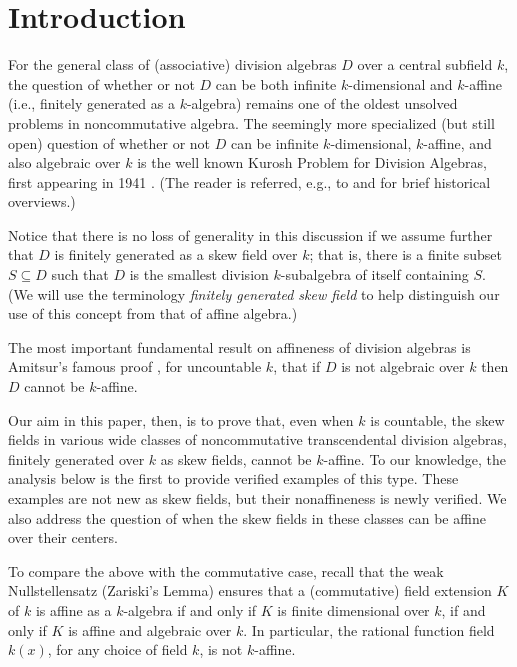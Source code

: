 \documentclass{conm-p-l}
\theoremstyle{definition}
\theoremstyle{remark}
\numberwithin{equation}{section}
\begin{document}
\maketitle 


\section{Introduction}



For the general class of (associative) division algebras $D$ over a central subfield $k$, the question of whether or not $D$ can be both infinite $k$-dimensional and $k$-aff\-ine (i.e., finitely generated as a $k$-algebra) remains one of the oldest unsolved problems in noncommutative algebra. The seemingly more specialized (but still open) question of whether or not $D$ can be infinite $k$-dimensional, $k$-affine, and also algebraic over $k$ is the well known Kurosh Problem for Division Algebras, first appearing in 1941 \cite{Kur}. (The reader is referred, e.g., to \cite{Smo} and \cite{Zel} for brief historical overviews.) 

Notice that there is no loss of generality in this discussion if we assume further that $D$ is finitely generated as a skew field over $k$; that is, there is a finite subset $S \subseteq D$ such that $D$ is the smallest division $k$-subalgebra of itself containing $S$. (We will use the terminology \emph{finitely generated skew field} to help distinguish our use of this concept from that of affine algebra.) 

The most important fundamental result on affineness of division algebras is Amitsur's famous proof \cite{Ami}, for uncountable $k$,  that if $D$ is not algebraic over $k$ then $D$ cannot be $k$-affine. 

Our aim in this paper, then, is to prove that, even when $k$ is countable, the skew fields in various wide classes of noncommutative transcendental division algebras, finitely generated over $k$ as skew fields, cannot be $k$-affine. To our knowledge, the analysis below is the first to provide verified examples of this type.  These examples are not new as skew fields, but their nonaffineness is newly verified. We also address the question of when the skew fields in these classes can be affine over their centers.

To compare the above with the commutative case, recall that the weak Nullstellensatz (Zariski's Lemma) \cite[Statement H$^n_3$]{Zar} ensures that a (commutative) field extension $K$ of $k$ is affine as a $k$-algebra if and only if $K$ is finite dimensional over $k$, if and only if $K$ is affine and algebraic over $k$. In particular, the rational function field $k(x)$, for any choice of field $k$, is not $k$-affine.
\end{document}

